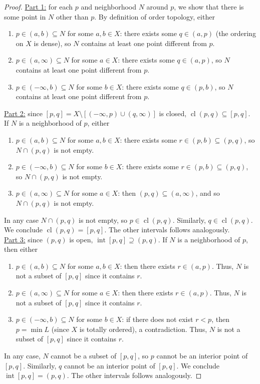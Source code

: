 \documentclass{treatise}
\begin{document}
\begin{proof}
\underline{Part 1:} for each $p$ and neighborhood $N$ around $p$, we show that there is some point in $N$ other than $p$. By definition of order topology, either
\begin{enumerate}
    \item $p \in (a, b) \subseteq N$ for some $a, b \in X$: there exists some $q \in (a, p)$ (the ordering on $X$ is dense), so $N$ contains at least one point different from $p$.
    \item $p \in (a, \infty) \subseteq N$ for some $a \in X$: there exists some $q \in (a, p)$, so $N$ contains at least one point different from $p$.
    \item $p \in (-\infty, b) \subseteq N$ for some $b \in X$: there exists some $q \in (p, b)$, so $N$ contains at least one point different from $p$.
\end{enumerate}
\underline{Part 2:} since $[p, q] = X \setminus [(-\infty, p) \cup (q, \infty)]$ is closed, $\operatorname{cl}(p, q) \subseteq [p, q]$. If $N$ is a neighborhood of $p$, either
\begin{enumerate}
    \item $p \in (a, b) \subseteq N$ for some $a, b \in X$: there exists some $r \in (p, b) \subseteq (p, q)$, so $N \cap (p, q)$ is not empty.
    \item $p \in (-\infty, b) \subseteq N$ for some $b \in X$: there exists some $r \in (p, b) \subseteq (p, q)$, so $N \cap (p, q)$ is not empty.
    \item $p \in (a, \infty) \subseteq N$ for some $a \in X$: then $(p, q) \subseteq (a, \infty)$, and so $N \cap (p, q)$ is not empty.
\end{enumerate}
In any case $N \cap (p, q)$ is not empty, so $p \in \operatorname{cl}(p, q)$. Similarly, $q \in \operatorname{cl}(p, q)$. We conclude $\operatorname{cl}(p, q) = [p, q]$. The other intervals follows analogously.
\\
\underline{Part 3:} since $(p, q)$ is open, $\operatorname{int}[p, q] \supseteq (p, q)$. If $N$ is a neighborhood of $p$, then either
\begin{enumerate}
    \item $p \in (a, b) \subseteq N$ for some $a, b \in X$: then there exists $r \in (a, p)$. Thus, $N$ is not a subset of $[p, q]$ since it contains $r$.
    \item $p \in (a, \infty) \subseteq N$ for some $a \in X$: then there exists $r \in (a, p)$. Thus, $N$ is not a subset of $[p, q]$ since it contains $r$.
    \item $p \in (-\infty, b) \subseteq N$ for some $b \in X$: if there does not exist $r < p$, then $p = \min L$ (since $X$ is totally ordered), a contradiction. Thus, $N$ is not a subset of $[p, q]$ since it contains $r$.
\end{enumerate}
In any case, $N$ cannot be a subset of $[p, q]$, so $p$ cannot be an interior point of $[p, q]$. Similarly, $q$ cannot be an interior point of $[p, q]$. We conclude $\operatorname{int}[p, q] = (p, q)$. The other intervals follows analogously.
\end{proof}
\end{document}
